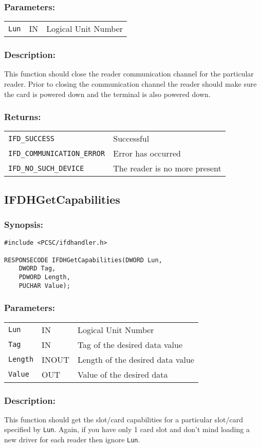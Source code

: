 \documentclass[a4paper,12pt]{article}
\newcommand{\synopsis}{\subsubsection{Synopsis:}}
\newcommand{\parameters}{\subsubsection{Parameters:}}
\newcommand{\desc}{\subsubsection{Description:}}
\newcommand{\returns}{\subsubsection{Returns:}}
\begin{document}
\parameters

\begin{tabular}{lll}
\texttt{Lun} & IN & Logical Unit Number \\
\end{tabular}

\desc

This function should close the reader communication channel for the
particular reader. Prior to closing the communication channel the reader
should make sure the card is powered down and the terminal is also
powered down.

\returns

\begin{tabular}{ll}
\texttt{IFD\_SUCCESS} & Successful\\
\texttt{IFD\_COMMUNICATION\_ERROR} & Error has occurred\\
\texttt{IFD\_NO\_SUCH\_DEVICE} & The reader is no more present\\
\end{tabular}


\subsection{IFDHGetCapabilities}

\synopsis
\begin{verbatim}
#include <PCSC/ifdhandler.h>

RESPONSECODE IFDHGetCapabilities(DWORD Lun,
    DWORD Tag,
    PDWORD Length,
    PUCHAR Value);
\end{verbatim}

\parameters

\begin{tabular}{lll}
\texttt{Lun} & IN & Logical Unit Number \\
\texttt{Tag} & IN & Tag of the desired data value \\
\texttt{Length} & INOUT & Length of the desired data value \\
\texttt{Value} & OUT & Value of the desired data \\
\end{tabular}

\desc

This function should get the slot/card capabilities for a particular
slot/card specified by \texttt{Lun}. Again, if you have only 1 card slot
and don't mind loading a new driver for each reader then ignore
\texttt{Lun}.
\end{document}
